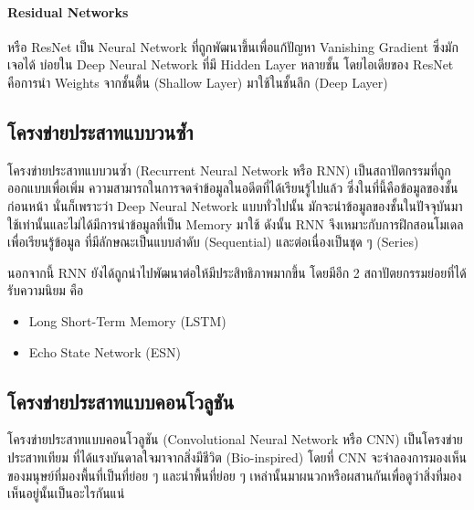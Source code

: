 \paragraph{Residual Networks} หรือ ResNet เป็น Neural Network ที่ถูกพัฒนาขึ้นเพื่อแก้ปัญหา Vanishing Gradient ซึ่งมักเจอได้%
บ่อยใน Deep Neural Network ที่มี Hidden Layer หลายชั้น โดยไอเดียของ ResNet คือการนำ Weights จากชั้นตื้น (Shallow Layer)
มาใช้ในชั้นลึก (Deep Layer)

\subsection{โครงข่ายประสาทแบบวนซ้ำ}
\label{ssec:rnn}

โครงข่ายประสาทแบบวนซ้ำ (Recurrent Neural Network หรือ RNN)\autocite{abiodun2018} เป็นสถาปัตกรรมที่ถูกออกแบบเพื่อเพิ่ม%
ความสามารถในการจดจำข้อมูลในอดีตที่ได้เรียนรู้ไปแล้ว ซึ่งในที่นี้คือข้อมูลของชั้นก่อนหน้า นั่นก็เพราะว่า Deep Neural Network แบบทั่วไปนั้น%
มักจะนำข้อมูลของชั้นในปัจจุบันมาใช้เท่านั้นและไม่ได้มีการนำข้อมูลที่เป็น Memory มาใช้ ดังนั้น RNN จึงเหมาะกับการฝึกสอนโมเดลเพื่อเรียนรู้ข้อมูล%
ที่มีลักษณะเป็นแบบลำดับ (Sequential) และต่อเนื่องเป็นชุด ๆ (Series)

นอกจากนี้ RNN ยังได้ถูกนำไปพัฒนาต่อให้มีประสิทธิภาพมากขึ้น โดยมีอีก 2 สถาปัตยกรรมย่อยที่ได้รับความนิยม คือ
%
\begin{itemize}[topsep=0pt,noitemsep]\setlength\itemsep{0.5em}
    \item Long Short-Term Memory (LSTM)\autocite{hochreiter1997a}
    \item Echo State Network (ESN)\autocite{jaeger2004}
\end{itemize}

\subsection{โครงข่ายประสาทแบบคอนโวลูชัน}
\label{ssec:cnn}

โครงข่ายประสาทแบบคอนโวลูชัน (Convolutional Neural Network หรือ CNN)\autocite{alzubaidi2021} เป็นโครงข่ายประสาทเทียม%
ที่ได้แรงบันดาลใจมาจากสิ่งมีชีวิต (Bio-inspired) โดยที่ CNN จะจำลองการมองเห็นของมนุษย์ที่มองพื้นที่เป็นที่ย่อย ๆ และนำพื้นที่ย่อย ๆ
เหล่านั้นมาผนวกหรือผสานกันเพื่อดูว่าสิ่งที่มองเห็นอยู่นั้นเป็นอะไรกันแน่

